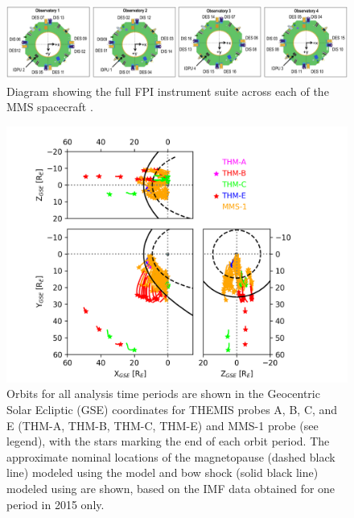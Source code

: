 
\begin{figure}
    \centering
    \includegraphics[width=\textwidth]{Figures/Instrumentation/Pollock_Figure5.jpg}
    \caption[MMS FPI instrument suite]{Diagram showing the full FPI instrument suite across each of the MMS spacecraft \citep{Pollock:2016}.}
    \label{fig:fpi-mms}
\end{figure}

\begin{figure}
    \centering
    \includegraphics[width=\textwidth]{Figures/Orbits/all_TE_orbits_xy_xz_yz.png}
    \caption[Orbits for all observation periods]{Orbits for all analysis time periods are shown in the Geocentric Solar Ecliptic (GSE) coordinates for THEMIS probes A, B, C, and E (THM-A, THM-B, THM-C, THM-E) and MMS-1 probe (see legend), with the stars marking the end of each orbit period. The approximate nominal locations of the magnetopause (dashed black line) modeled using the \cite{Shue:1997} model and bow shock (solid black line) modeled using \cite{SlavinHolzer:1984} are shown, based on the IMF data obtained for one period in 2015 only.}
    \label{fig:all-orbits-plot}
\end{figure}

